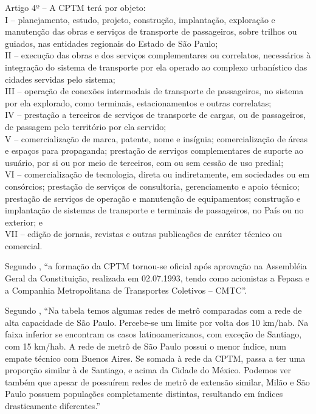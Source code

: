 	\begin{citacao}
	 	Artigo 4º -- A CPTM terá por objeto:\\
		I -- planejamento, estudo, projeto, construção, implantação, exploração e manutenção das obras e serviços de transporte de passageiros, sobre trilhos ou guiados, nas entidades regionais do Estado de São Paulo;\\
		II -- execução das obras e dos serviços complementares ou correlatos, necessários à integração do sistema de transporte por ela operado ao complexo urbanístico das cidades servidas pelo sistema; \\
		III --  operação de conexões intermodais de transporte de passageiros, no sistema por ela explorado, como terminais, estacionamentos e outras correlatas;\\
		IV -- prestação a terceiros de serviços de transporte de cargas, ou de passageiros, de passagem pelo território por ela servido;\\
		V -- comercialização de marca, patente, nome e insígnia; comercialização de áreas e espaços para propaganda; prestação de serviços complementares de suporte ao usuário, por si ou por meio de terceiros, com ou sem cessão de uso predial;\\
		VI -- comercialização de tecnologia, direta ou indiretamente, em sociedades ou em consórcios; prestação de serviços de consultoria, gerenciamento e apoio técnico; prestação de serviços de operação e manutenção de equipamentos; construção e implantação de sistemas de transporte e terminais de passageiros, no País ou no exterior; e\\
		VII -- edição de jornais, revistas e outras publicações de caráter técnico ou comercial.\cite{lei7861}
	\end{citacao}
	
	
	Segundo , ``a formação da CPTM tornou-se oficial após aprovação na Assembléia Geral da Constituição, realizada em 02.07.1993, tendo como acionistas a Fepasa e a Companhia Metropolitana de Transportes Coletivos – CMTC''.
	
	Segundo , ``Na tabela temos algumas redes de metrô comparadas com a rede de alta  capacidade  de  São  Paulo.  Percebe-se  um  limite  por  volta  dos  10 km/hab.  Na  faixa  inferior  se  encontram  os  casos  latinoamericanos, com  exceção  de  Santiago,  com  15  km/hab.  A  rede  de  metrô  de  São Paulo possui o menor índice, num empate técnico com Buenos Aires. Se  somada  à  rede  da  CPTM,  passa  a  ter  uma  proporção  similar  à  de Santiago,  e  acima  da  Cidade  do  México.  Podemos  ver  também  que apesar de possuírem redes de metrô de extensão similar, Milão e São Paulo  possuem  populações  completamente  distintas,  resultando  em índices drasticamente diferentes.''
	
